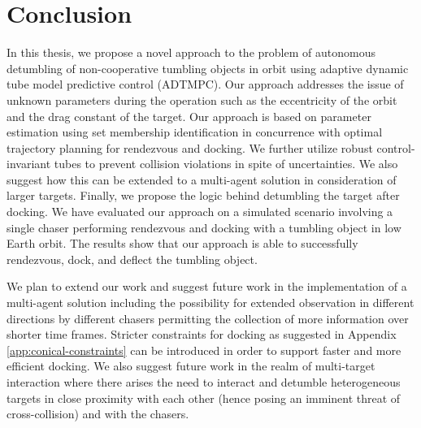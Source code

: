 \chapter{Conclusion}
\label{ch:conclusion}
In this thesis, we propose a novel approach to the problem of autonomous detumbling of non-cooperative tumbling objects in orbit using adaptive dynamic tube model predictive control (ADTMPC).
Our approach addresses the issue of unknown parameters during the operation such as the eccentricity of the orbit and the drag constant of the target.
Our approach is based on parameter estimation using set membership identification in concurrence with optimal trajectory planning for rendezvous and docking.
We further utilize robust control-invariant tubes to prevent collision violations in spite of uncertainties.
We also suggest how this can be extended to a multi-agent solution in consideration of larger targets.
Finally, we propose the logic behind detumbling the target after docking.
We have evaluated our approach on a simulated scenario involving a single chaser performing rendezvous and docking with a tumbling object in low Earth orbit.
The results show that our approach is able to successfully rendezvous, dock, and deflect the tumbling object.

We plan to extend our work and suggest future work in the implementation of a multi-agent solution including the possibility for extended observation in different directions by different chasers permitting the collection of more information over shorter time frames.
Stricter constraints for docking as suggested in Appendix \ref{app:conical-constraints} can be introduced in order to support faster and more efficient docking.
We also suggest future work in the realm of multi-target interaction where there arises the need to interact and detumble heterogeneous targets in close proximity with each other (hence posing an imminent threat of cross-collision) and with the chasers.